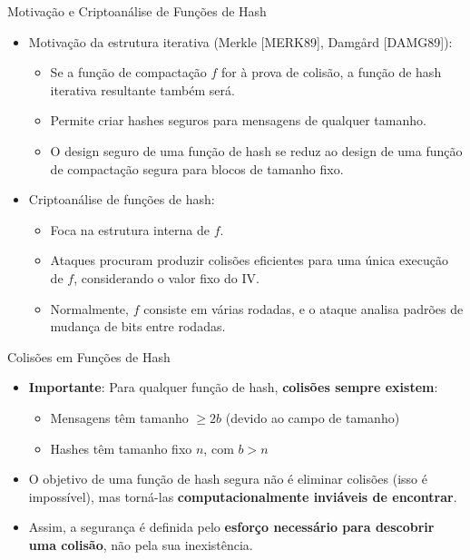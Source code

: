 \begin{frame}{Motivação e Criptoanálise de Funções de Hash}
    \begin{itemize}
        \item Motivação da estrutura iterativa (Merkle [MERK89], Damgård [DAMG89]):
              \begin{itemize}
                  \item Se a função de compactação $f$ for à prova de colisão, a função de hash iterativa resultante também será.
                  \item Permite criar hashes seguros para mensagens de qualquer tamanho.
                  \item O design seguro de uma função de hash se reduz ao design de uma função de compactação segura para blocos de tamanho fixo.
              \end{itemize}
        \item Criptoanálise de funções de hash:
              \begin{itemize}
                  \item Foca na estrutura interna de $f$.
                  \item Ataques procuram produzir colisões eficientes para uma única execução de $f$, considerando o valor fixo do IV.
                  \item Normalmente, $f$ consiste em várias rodadas, e o ataque analisa padrões de mudança de bits entre rodadas.
              \end{itemize}
    \end{itemize}
\end{frame}

\begin{frame}{Colisões em Funções de Hash}
    \begin{itemize}
        \item \textbf{Importante}: Para qualquer função de hash, \textbf{colisões sempre existem}:
              \begin{itemize}
                  \item Mensagens têm tamanho $\ge 2b$ (devido ao campo de tamanho)
                  \item Hashes têm tamanho fixo $n$, com $b > n$
              \end{itemize}
        \item O objetivo de uma função de hash segura não é eliminar colisões (isso é impossível),
              mas torná-las \textbf{computacionalmente inviáveis de encontrar}.
        \item Assim, a segurança é definida pelo \textbf{esforço necessário para descobrir uma colisão}, não pela sua inexistência.
    \end{itemize}
\end{frame}

